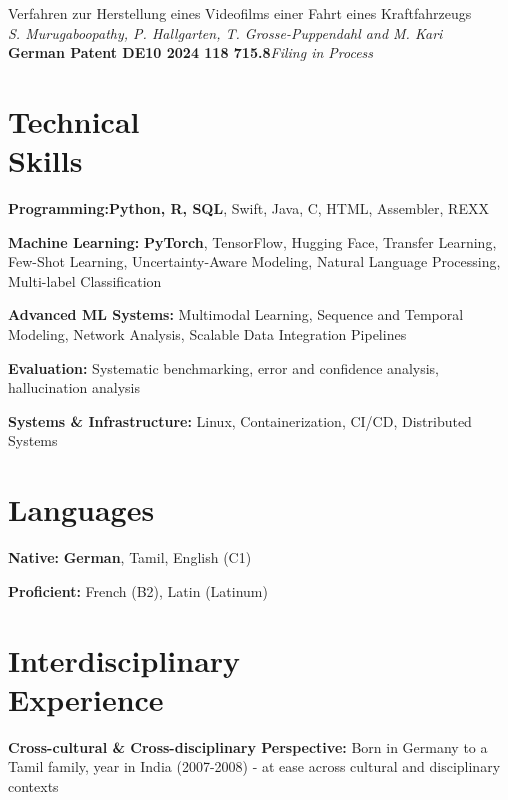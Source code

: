 \documentclass[margin,line]{resume}
\begin{document}
\begin{resume}
\begin{list2}
        \item Verfahren zur Herstellung eines Videofilms einer Fahrt eines Kraftfahrzeugs\\
        \textsl{S. Murugaboopathy, P. Hallgarten, T. Grosse-Puppendahl and M. Kari}\\
        \textbf{German Patent DE10 2024 118 715.8}\hfill \textit{Filing in Process}
        \end{list2}

    \section{\mysidestyle \normalsize{Technical\\Skills}}
    \begin{list2}\setlength\itemsep{0.75mm}
        \item \textbf{Programming:}\space \textbf{Python, R, SQL}, Swift, Java, C, HTML, Assembler, REXX
        \item \textbf{Machine Learning:} \textbf{PyTorch}, TensorFlow, Hugging Face, Transfer Learning, Few-Shot Learning, Uncertainty-Aware Modeling, Natural Language Processing, Multi-label Classification
        \item \textbf{Advanced ML Systems:} Multimodal Learning, Sequence and Temporal Modeling, Network Analysis, Scalable Data Integration Pipelines
        \item \textbf{Evaluation:} Systematic benchmarking, error and confidence analysis, hallucination analysis
        \item \textbf{Systems \& Infrastructure:} Linux, Containerization, CI/CD, Distributed Systems
    \end{list2}

    \section{\mysidestyle \normalsize{Languages}}
        \begin{list2}\setlength\itemsep{0.75mm}
            \item \textbf{Native:} \textbf{German}, Tamil, English (C1)
            \item \textbf{Proficient:} French (B2), Latin (Latinum)
        \end{list2}

    \section{\mysidestyle \normalsize{Interdisciplinary\\Experience}}
        \begin{list2}\setlength\itemsep{0.75mm}
        \item \textbf{Cross-cultural \& Cross-disciplinary Perspective:} Born in Germany to a Tamil family, year in India (2007-2008) - at ease across cultural and disciplinary contexts


\end{list2}
\end{resume}
\end{document}
